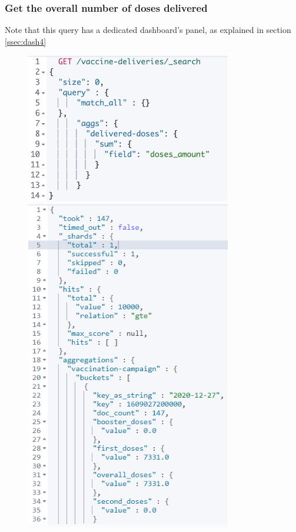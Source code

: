 \documentclass{article}[IEEEtran]
\begin{document}
\newpage

\subsubsection{Get the overall number of doses delivered}\label{ssec:q13}

Note that this query has a dedicated dashboard's panel, as explained in section \ref{ssec:dash4}

\begin{figure}[H]
\begin{center}
\begin{minipage}[b]{0.4\textwidth}
    \includegraphics[width=0.8\textwidth, frame]{Query_13.PNG}
    \subcaption{}
  \end{minipage}
  \hfill
  \begin{minipage}[b]{0.4\textwidth}
    \includegraphics[width=0.8\textwidth, frame]{Answer_Query_1.PNG}

\end{minipage}
\end{center}
\end{figure}
\end{document}
